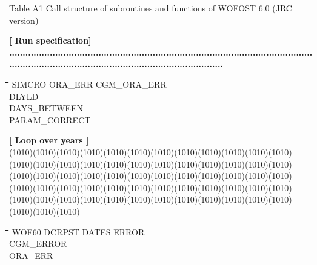 Table A1 Call structure of subroutines and functions of WOFOST 6.0 (JRC version)

\strut\hfill {\bf [ Run specification]}
{\bf ...............................................................................................................................................................................................\-}
\begin{tabbing}
\hspace{1.27cm}\=\hspace{1.27cm}\=\hspace{1.27cm}\=\hspace{1.27cm}\=%
\hspace{1.27cm}\=\hspace{1.27cm}\=\hspace{1.27cm}\=\hspace{1.27cm}\=%
\hspace{1.27cm}\=\hspace{1.27cm}\=\kill
SIMCRO\> ORA\_ERR\> \> CGM\_ORA\_ERR\\
\>DLYLD\\
\>DAYS\_BETWEEN\\
\>PARAM\_CORRECT
\end{tabbing}
\strut\hfill {\bf [ Loop over years ]}\\
 \GrBox(1010)\GrBox(1010)\GrBox(1010)\GrBox(1010)\GrBox(1010)\GrBox(1010)\GrBox(1010)\GrBox(1010)\GrBox(1010)\GrBox(1010)\GrBox(1010)\GrBox(1010)\GrBox(1010)\GrBox(1010)\GrBox(1010)\GrBox(1010)\GrBox(1010)\GrBox(1010)\GrBox(1010)\GrBox(1010)\GrBox(1010)\GrBox(1010)\GrBox(1010)\GrBox(1010)\GrBox(1010)\GrBox(1010)\GrBox(1010)\GrBox(1010)\GrBox(1010)\GrBox(1010)\GrBox(1010)\GrBox(1010)\GrBox(1010)\GrBox(1010)\GrBox(1010)\GrBox(1010)\GrBox(1010)\GrBox(1010)\GrBox(1010)\GrBox(1010)\GrBox(1010)\GrBox(1010)\GrBox(1010)\GrBox(1010)\GrBox(1010)\GrBox(1010)\GrBox(1010)\GrBox(1010)\GrBox(1010)\GrBox(1010)\GrBox(1010)\GrBox(1010)\GrBox(1010)\GrBox(1010)\GrBox(1010)\GrBox(1010)\GrBox(1010)\GrBox(1010)\GrBox(1010)\GrBox(1010)\GrBox(1010)\GrBox(1010)\GrBox(1010)\nwln
\begin{tabbing}
\hspace{1.27cm}\=\hspace{1.27cm}\=\hspace{1.27cm}\=\hspace{1.27cm}\=%
\hspace{1.27cm}\=\hspace{1.27cm}\=\hspace{1.27cm}\=\hspace{1.27cm}\=%
\hspace{1.27cm}\=\hspace{1.27cm}\=\kill
\>WOF60\> \> DCRPST\> \> DATES\> \> ERROR\\
\>\> \> \> \> CGM\_ERROR\\
\>\> \> \> \> ORA\_ERR
\end{tabbing}
